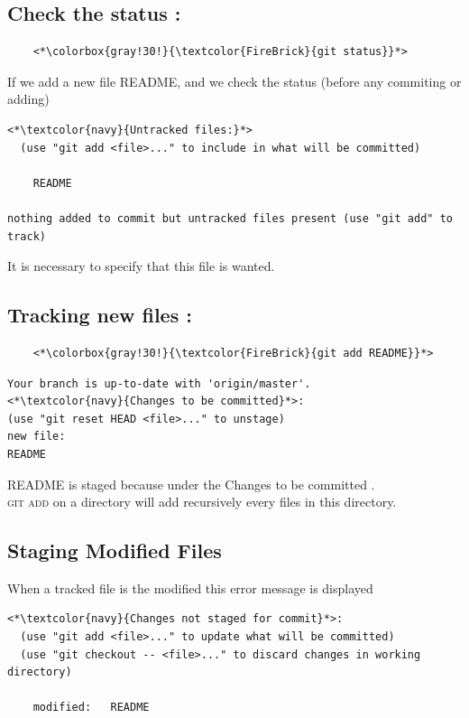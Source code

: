 \documentclass[a4paper,12pt]{article}
\newcommand\bk{\color{black}}
\newcommand\navy{\color{navy}}
\numberwithin{equation}{section} %
\begin{document}
\subsection*{Check the status :}
\begin{lstlisting}
	<*\colorbox{gray!30!}{\textcolor{FireBrick}{git status}}*>
\end{lstlisting}

If we add a new file README, and we check the status (before any commiting or adding)
\begin{lstlisting}
<*\textcolor{navy}{Untracked files:}*>
  (use "git add <file>..." to include in what will be committed)

	README

nothing added to commit but untracked files present (use "git add" to track)
\end{lstlisting}
It is necessary to specify that this file is wanted. \\[4mm]

\subsection*{Tracking new files :}
\begin{lstlisting}
	<*\colorbox{gray!30!}{\textcolor{FireBrick}{git add README}}*>
\end{lstlisting}
\begin{lstlisting}
Your branch is up-to-date with 'origin/master'.
<*\textcolor{navy}{Changes to be committed}*>:
(use "git reset HEAD <file>..." to unstage)
new file:
README
\end{lstlisting}
README is staged because under the \navy Changes to be committed \bk.\\ \textsc{git add} on a directory will add recursively every files in this directory. \\[4mm]

\pagebreak

\subsection*{Staging Modified Files}
When a tracked file is the modified this error message is displayed 
\begin{lstlisting}
<*\textcolor{navy}{Changes not staged for commit}*>:
  (use "git add <file>..." to update what will be committed)
  (use "git checkout -- <file>..." to discard changes in working directory)

	modified:   README
\end{lstlisting}
\end{document}
